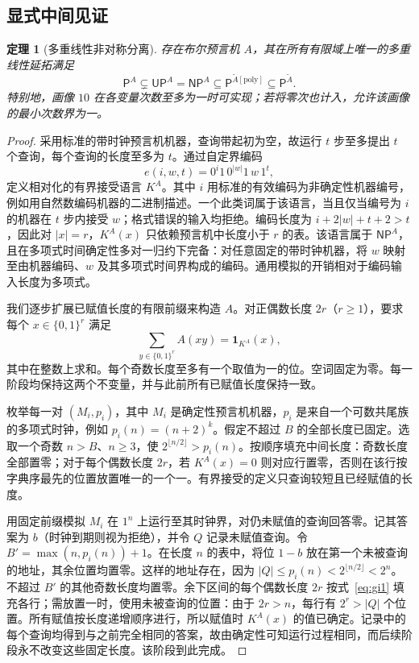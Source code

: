 \documentclass[11pt,a4paper]{article}
\newcommand{\bits}{\{0,1\}}
\newcommand{\PP}{\mathsf{P}}
\newcommand{\NP}{\mathsf{NP}}
\newcommand{\UP}{\mathsf{UP}}
\newcommand{\Atil}{\widetilde A}
\newtheorem{theorem}{定理}[section]
\begin{document}
\subsection{显式中间见证}
\begin{theorem}[多重线性非对称分离]\label{thm:w10}
存在布尔预言机 $A$，其在所有有限域上唯一的多重线性延拓满足
\begin{equation}\label{eq:w10}
\PP^A\subsetneq\UP^A=\NP^A\subseteq\PP^{\Atil[\mathrm{poly}]}\subseteq\PP^{\Atil}.
\end{equation}
特别地，画像 $10$ 在各变量次数至多为一时可实现；若将零次也计入，允许该画像的最小次数界为一。
\end{theorem}
\begin{proof}
采用标准的带时钟预言机机器，查询带起初为空，故运行 $t$ 步至多提出 $t$ 个查询，每个查询的长度至多为 $t$。通过自定界编码
\[
e(i,w,t)=0^i1\,0^{|w|}1\,w\,1^t,
\]
定义相对化的有界接受语言 $K^A$。其中 $i$ 用标准的有效编码为非确定性机器编号，例如用自然数编码机器的二进制描述。一个此类词属于该语言，当且仅当编号为 $i$ 的机器在 $t$ 步内接受 $w$；格式错误的输入均拒绝。编码长度为 $i+2|w|+t+2>t$，因此对 $|x|=r$，$K^A(x)$ 只依赖预言机中长度小于 $r$ 的表。该语言属于 $\NP^A$，且在多项式时间确定性多对一归约下完备：对任意固定的带时钟机器，将 $w$ 映射至由机器编码、$w$ 及其多项式时间界构成的编码。通用模拟的开销相对于编码输入长度为多项式。

我们逐步扩展已赋值长度的有限前缀来构造 $A$。对正偶数长度 $2r$（$r\ge1$），要求每个 $x\in\bits^r$ 满足
\begin{equation}\label{eq:gi1}
\sum_{y\in\bits^r}A(xy)=\mathbf1_{K^A}(x),
\end{equation}
其中在整数上求和。每个奇数长度至多有一个取值为一的位。空词固定为零。每一阶段均保持这两个不变量，并与此前所有已赋值长度保持一致。

枚举每一对 $(M_i,p_i)$，其中 $M_i$ 是确定性预言机机器，$p_i$ 是来自一个可数共尾族的多项式时钟，例如 $p_i(n)=(n+2)^k$。假定不超过 $B$ 的全部长度已固定。选取一个奇数 $n>B$、$n\ge3$，使 $2^{\lfloor n/2\rfloor}>p_i(n)$。按顺序填充中间长度：奇数长度全部置零；对于每个偶数长度 $2r$，若 $K^A(x)=0$ 则对应行置零，否则在该行按字典序最先的位置放置唯一的一个一。有界接受的定义只查询较短且已经赋值的长度。

用固定前缀模拟 $M_i$ 在 $1^n$ 上运行至其时钟界，对仍未赋值的查询回答零。记其答案为 $b$（时钟到期则视为拒绝），并令 $Q$ 记录未赋值查询。令 $B'=\max(n,p_i(n))+1$。在长度 $n$ 的表中，将位 $1-b$ 放在第一个未被查询的地址，其余位置均置零。这样的地址存在，因为 $|Q|\le p_i(n)<2^{\lfloor n/2\rfloor}<2^n$。不超过 $B'$ 的其他奇数长度均置零。余下区间的每个偶数长度 $2r$ 按式~\eqref{eq:gi1} 填充各行；需放置一时，使用未被查询的位置：由于 $2r>n$，每行有 $2^r>|Q|$ 个位置。所有赋值按长度递增顺序进行，所以赋值时 $K^A(x)$ 的值已确定。记录中的每个查询均得到与之前完全相同的答案，故由确定性可知运行过程相同，而后续阶段永不改变这些固定长度。该阶段到此完成。


\end{proof}
\end{document}
